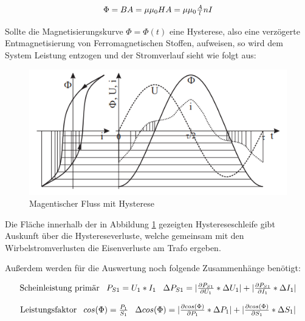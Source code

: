 \documentclass[12pt,a4paper,twoside]{article}
\begin{document}
\begin{equation}
    \label{eq:Magnetischer Fluss}
    \centerline{$\Phi = BA = \mu \mu_{0} HA = \mu \mu_{0} \frac{A}{l} nI$}
\end{equation}

\noindent
Sollte die Magnetisierungskurve $\Phi = \Phi(t)$ eine Hysterese, also eine verzögerte Entmagnetisierung von Ferromagnetischen Stoffen, aufweisen, so wird dem System Leistung entzogen und der Stromverlauf sieht wie folgt aus:

\begin{figure}[H]
    \centering
    \includegraphics[width=0.5\linewidth]{nudes/GL-Hysterese.png}
    \caption{Magentischer Fluss mit Hysterese \cite{teachcenter2}}
    \label{fig:Hystere}
\end{figure}

\noindent
Die Fläche innerhalb der in Abbildung \ref{fig:Hystere} gezeigten Hystereseschleife gibt Auskunft über die Hystereseverluste, welche gemeinsam mit den Wirbelstromverlusten die Eisenverluste am Trafo ergeben. \newline

\noindent
Außerdem werden für die Auswertung noch folgende Zusammenhänge benötigt:

\begin{equation}
    \label{eq:Scheinleistung}
    \centerline{Scheinleistung primär \\ $P_{S1} = U_{1}*I_{1}$ \\ $\Delta P_{S1} = \vert \frac{\partial P_{S1}}{\partial U_{1}} * \Delta U_{1} \vert + \vert \frac{\partial P_{S1}}{\partial I_{1}} * \Delta I_{1} \vert $}
\end{equation}

\begin{equation}
    \label{eq:Leistungsfaktor}
    \centerline{Leistungsfaktor \\ $cos(\Phi) = \frac{P_{1}}{S_{1}}$ \\ $\Delta cos(\Phi) = \vert \frac{\partial cos(\Phi)}{\partial P_{1}} * \Delta P_{1} \vert + \vert \frac{\partial cos(\Phi)}{\partial S_{1}} * \Delta S_{1} \vert $}
\end{equation}
\end{document}
